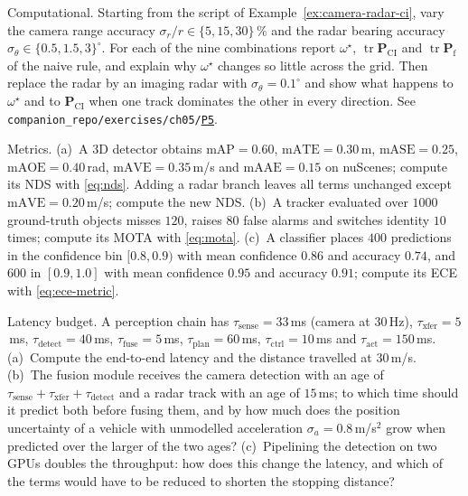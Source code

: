 \documentclass[graybox,envcountchap]{style/SNmono}
\DeclareMathOperator{\tr}{tr}
\newcommand{\repopath}[1]{\texttt{#1}}
\providecommand{\DIFadd}[1]{{\protect\color{blue} #1}} %
\providecommand{\DIFdel}[1]{{\protect\color{red} #1}} %
\DeclareRobustCommand{\RtwoDel}[1]{{\color{red}%
  \renewcommand{\DIFadd}[1]{##1}\renewcommand{\DIFdel}[1]{##1}%
  #1}}
\DeclareRobustCommand{\RtwoAdd}[1]{{\color{blue}#1}}
\DeclareRobustCommand{\codeentry}[1]{\hyperref[code:#1]{\texttt{#1}}}
\begin{document}
\begin{prob}\label{prob:ch05:6}
Computational. Starting from the script of Example~\ref{ex:camera-radar-ci}, vary the camera range accuracy $\sigma_{r}/r\in\{5,15,30\}$\,\% and the radar bearing accuracy $\sigma_{\theta}\in\{0.5,1.5,3\}^{\circ}$. For each of the nine combinations report $\omega^{\star}$, $\tr\mathbf{P}_{\mathrm{CI}}$ and $\tr\mathbf{P}_{\mathrm{f}}$ of the naive rule, and explain why $\omega^{\star}$ changes so little across the grid. Then replace the radar by an imaging radar with $\sigma_{\theta}=0.1^{\circ}$ and show what happens to $\omega^{\star}$ and to $\mathbf{P}_{\mathrm{CI}}$ when one track dominates the other in every direction. See \RtwoDel{\repopath{companion\_\allowbreak repo/\allowbreak exercises/\allowbreak ch05/\allowbreak }}\RtwoAdd{\codeentry{P5}}.
\end{prob}

\begin{prob}\label{prob:ch05:7}
Metrics. (a)~A 3D detector obtains $\mathrm{mAP}=0.60$, $\mathrm{mATE}=0.30$\,m, $\mathrm{mASE}=0.25$, $\mathrm{mAOE}=0.40$\,rad, $\mathrm{mAVE}=0.35$\,m/s and $\mathrm{mAAE}=0.15$ on nuScenes; compute its NDS with \eqref{eq:nds}. Adding a radar branch leaves all terms unchanged except $\mathrm{mAVE}=0.20$\,m/s; compute the new NDS. (b)~A tracker evaluated over $1000$ ground-truth objects misses $120$, raises $80$ false alarms and switches identity $10$ times; compute its MOTA with \eqref{eq:mota}. (c)~A classifier places $400$ predictions in the confidence bin $[0.8,0.9)$ with mean confidence $0.86$ and accuracy $0.74$, and $600$ in $[0.9,1.0]$ with mean confidence $0.95$ and accuracy $0.91$; compute its ECE with \eqref{eq:ece-metric}.
\end{prob}

\begin{prob}\label{prob:ch05:8}
Latency budget. A perception chain has $\tau_{\mathrm{sense}}=33$\,ms (camera at $30$\,Hz), $\tau_{\mathrm{xfer}}=5$\,ms, $\tau_{\mathrm{detect}}=40$\,ms, $\tau_{\mathrm{fuse}}=5$\,ms, $\tau_{\mathrm{plan}}=60$\,ms, $\tau_{\mathrm{ctrl}}=10$\,ms and $\tau_{\mathrm{act}}=150$\,ms. (a)~Compute the end-to-end latency and the distance travelled at $30$\,m/s. (b)~The fusion module receives the camera detection with an age of $\tau_{\mathrm{sense}}+\tau_{\mathrm{xfer}}+\tau_{\mathrm{detect}}$ and a radar track with an age of $15$\,ms; to which time should it predict both before fusing them, and by how much does the position uncertainty of a vehicle with unmodelled acceleration $\sigma_{a}=0.8$\,m/s$^{2}$ grow when predicted over the larger of the two ages? (c)~Pipelining the detection on two GPUs doubles the throughput: how does this change the latency, and which of the terms would have to be reduced to shorten the stopping distance?
\end{prob}
\end{document}
